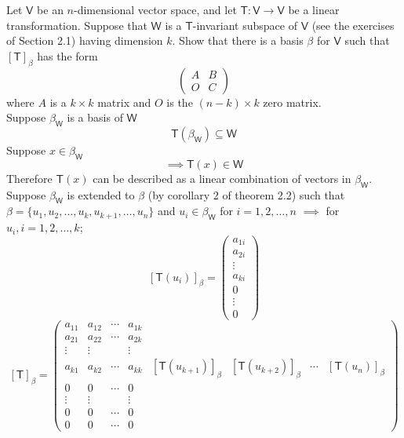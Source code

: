 Let $\mathsf{V}$ be an $n$-dimensional vector space, and let
$\mathsf{T}\colon\mathsf{V}\to\mathsf{V}$ be a linear
transformation. Suppose that $\mathsf{W}$ is a $\mathsf{T}$-invariant
subspace of $\mathsf{V}$ (see the exercises of Section 2.1) having
dimension $k$. Show that there is a basis $\beta$ for $\mathsf{V}$
such that $\left[\mathsf{T}\right]_\beta$ has the form
\[
\begin{pmatrix}
A & B\\
O & C
\end{pmatrix}
\]
where $A$ is a $k\times k$ matrix and $O$ is the $(n-k) \times k$ zero matrix.
\\Suppose $\beta_\mathsf{W}$ is a basis of $\mathsf{W}$
\begin{equation}
\mathsf{T}(\beta_\mathsf{W}) \subseteq \mathsf{W}
\end{equation}
Suppose $x\in \beta_\mathsf{W}$ 
\begin{equation}
\implies \mathsf{T}(x) \in \mathsf{W}
\end{equation}
Therefore $\mathsf{T}(x) $ can be described as a linear combination of
vectors in $\beta_\mathsf{W}$.
\\Suppose $\beta_\mathsf{W}$ is extended to $\beta$ (by corollary 2 of
theorem 2.2) such that $\beta =
\{u_1,u_2,\dots,u_k,u_{k+1},\dots,u_n\}$ and $u_i \in
\beta_\mathsf{W}$ for $i=1,2,\dots,n$ $\implies$ for $u_i,
i=1,2,\dots,k$;
\begin{equation}
\left[\mathsf{T}(u_i)\right]_\beta =
\begin{pmatrix}
a_{1i}\\a_{2i}\\\vdots\\a_{ki}\\0\\\vdots\\0
\end{pmatrix}
\end{equation}
\begin{equation}
\left[\mathsf{T}\right]_\beta = 
\begin{pmatrix}
a_{11} & a_{12} & \cdots & a_{1k} & & &  \\
a_{21} & a_{22} & \cdots & a_{2k} & & &  \\
\vdots & \vdots &  & \vdots & & & &  \\
a_{k1} & a_{k2} & \cdots & a_{kk} &
\left[\mathsf{T}(u_{k+1})\right]_\beta &
\left[\mathsf{T}(u_{k+2})\right]_\beta & \cdots &
\left[\mathsf{T}(u_n)\right]_\beta\\
0 & 0 & \cdots & 0 & & & &  \\
\vdots & \vdots &  & \vdots & & & &  \\
0 & 0 & \cdots & 0 & & & &  \\
0 & 0 & \cdots & 0 & & & &  
\end{pmatrix}
\end{equation}
